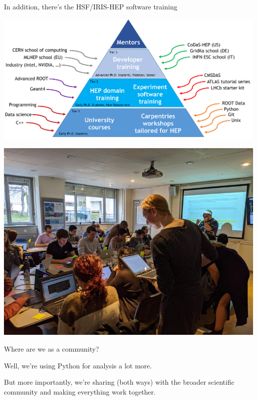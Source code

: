 \documentclass[aspectratio=169]{beamer}
\begin{document}
\begin{frame}{In addition, there's the HSF/IRIS-HEP software training}
\vspace{1.25 cm}

\mbox{\hspace{-0.75 cm}\includegraphics[width=\linewidth]{PLOTS/Training-Pyramid.png}}

\vspace{-7.75 cm}
\hfill \mbox{\includegraphics[width=4 cm]{PLOTS/instructor_mentor_small.jpg}\hspace{-1 cm}}
\vspace{7.75 cm}
\end{frame}

\begin{frame}{Where are we as a community?}
\Large

Well, we're using Python for analysis a lot more.

\vspace{1 cm}
But more importantly, we're sharing (both ways) with the broader scientific community and making everything work together.
\end{frame}
\end{document}
